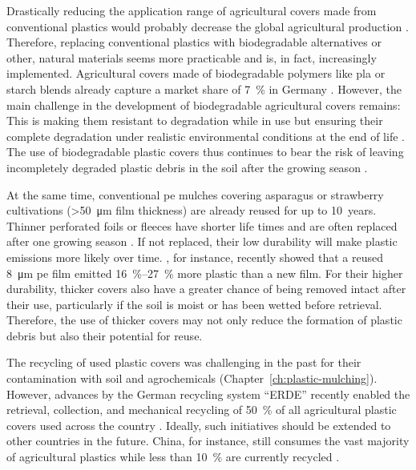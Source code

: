 Drastically reducing the application range of agricultural covers made from conventional plastics would probably decrease the global agricultural production \citep[Chapter~\ref{ch:plastic-mulching};][]{FAOAssessment2021}. Therefore, replacing conventional plastics with biodegradable alternatives or other, natural materials seems more practicable \citep{BrandesMikro2020} and is, in fact, increasingly implemented. Agricultural covers made of biodegradable polymers like \ac{pla} or starch blends already capture a market share of \SI{7}{\percent} in Germany \citep{BertlingKunststoffe2021}. However, the main challenge in the development of biodegradable agricultural covers remains: This is making them resistant to degradation while in use but ensuring their complete degradation under realistic environmental conditions at the end of life \citep[Chapter~\ref{ch:plastic-mulching};][]{BertlingKunststoffe2021}. The use of biodegradable plastic covers thus continues to bear the risk of leaving incompletely degraded plastic debris in the soil after the growing season \citep{SanderBiodegradation2019,VieraAre2021}.

At the same time, conventional \ac{pe} mulches covering asparagus or strawberry cultivations (\SI{>50}{\micro\meter} film thickness) are already reused for up to \SI{10}{years}. Thinner perforated foils or fleeces have shorter life times and are often replaced after one growing season \citep[Chapter~\ref{ch:screening};][]{BertlingKunststoffe2021}. If not replaced, their low durability will make plastic emissions more likely over time. , for instance, recently showed that a reused \SI{8}{\micro\meter} \ac{pe} film emitted \SIrange{16}{27}{\percent} more plastic than a new film.
For their higher durability, thicker covers also have a greater chance of being removed intact after their use, particularly if the soil is moist or has been wetted before retrieval. 
Therefore, the use of thicker covers may not only reduce the formation of plastic debris but also their potential for reuse.

The recycling of used plastic covers was challenging in the past for their contamination with soil and agrochemicals (Chapter~\ref{ch:plastic-mulching}). However, advances by the German recycling system ``ERDE'' recently enabled the retrieval, collection, and mechanical recycling of \SI{50}{\percent} of all agricultural plastic covers used across the country \citep{BertlingKunststoffe2021,ERDERecyclingERDE2021}. Ideally, such initiatives should be extended to other countries in the future. China, for instance, still consumes the vast majority of agricultural plastics \citep[Chapter~\ref{ch:plastic-mulching};][]{MormileWorld2017} while less than \SI{10}{\percent} are currently recycled \citep{FAOAssessment2021}.

